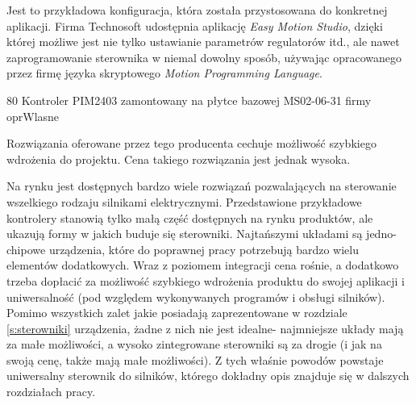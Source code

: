Jest to przykładowa konfiguracja, która została przystosowana do konkretnej aplikacji. Firma Technosoft udostępnia aplikację {\it Easy Motion Studio}, dzięki której możliwe jest nie tylko ustawianie parametrów regulatorów itd., ale nawet zaprogramowanie sterownika w niemal dowolny sposób, używając opracowanego przez firmę języka skryptowego {\it Motion Programming Language}. 

	{80}
	{Kontroler PIM2403 zamontowany na płytce bazowej MS02-06-31 firmy \firma{}}
	{oprWlasne}

Rozwiązania oferowane przez tego producenta cechuje możliwość szybkiego wdrożenia do projektu. Cena takiego rozwiązania jest jednak wysoka. 


Na rynku jest dostępnych bardzo wiele rozwiązań pozwalających na sterowanie wszelkiego rodzaju silnikami elektrycznymi. Przedstawione przykładowe kontrolery stanowią tylko małą część dostępnych na rynku produktów, ale ukazują formy w jakich buduje się sterowniki. Najtańszymi układami są jedno-chipowe urządzenia, które do poprawnej pracy potrzebują bardzo wielu elementów dodatkowych. Wraz z poziomem integracji cena rośnie, a dodatkowo trzeba dopłacić za możliwość szybkiego wdrożenia produktu do swojej aplikacji i uniwersalność (pod względem wykonywanych programów i obsługi silników). \\

Pomimo wszystkich zalet jakie posiadają zaprezentowane w rozdziale \ref{s:sterowniki} urządzenia, żadne z nich nie jest idealne- najmniejsze układy mają za małe możliwości, a wysoko zintegrowane sterowniki są za drogie (i jak na swoją cenę, także mają małe możliwości). Z tych właśnie powodów powstaje uniwersalny sterownik do silników, którego dokładny opis znajduje się w dalszych rozdziałach pracy.







\clearpage


